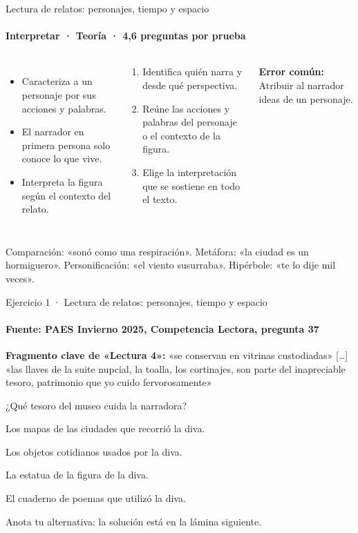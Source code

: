 \documentclass[aspectratio=169,11pt]{beamer}
\newcommand{\alternativa}[2]{\begin{opcion}\tecla{#1}\hspace{0.6em}#2\end{opcion}}
\newlength{\ajustealto}
\newenvironment{ajustar}[1][0.74\textheight]
  {\setlength{\ajustealto}{#1}\begin{lrbox}{\ajustecaja}\begin{minipage}{\textwidth}}
  {\end{minipage}\end{lrbox}%
   \ifdim\dimexpr\ht\ajustecaja+\dp\ajustecaja\relax>\ajustealto
     \resizebox*{!}{\ajustealto}{\usebox{\ajustecaja}}\else\usebox{\ajustecaja}\fi}
\begin{document}
\begin{frame}{Lectura de relatos: personajes, tiempo y espacio}
\label{tema-cl-literario}
\framesubtitle{Interpretar · Teoría · 4,6 preguntas por prueba}
\begin{ajustar}
\begin{columns}[T,onlytextwidth]
\begin{itemize}\footnotesize
\item Caracteriza a un personaje por sus acciones y palabras.
\item El narrador en primera persona solo conoce lo que vive.
\item Interpreta la figura según el contexto del relato.
\end{itemize}
\begin{cajaregla}\scriptsize \begin{enumerate}\item Identifica quién narra y desde qué perspectiva.\item Reúne las acciones y palabras del personaje o el contexto de la figura.\item Elige la interpretación que se sostiene en todo el texto.\end{enumerate}\end{cajaregla}
\begin{notagris}\scriptsize \textbf{Error común:} Atribuir al narrador ideas de un personaje.\end{notagris}
\end{columns}
\begin{cajaclave}\footnotesize
Comparación: «sonó como una respiración». Metáfora: «la ciudad es un hormiguero». Personificación: «el viento susurraba». Hipérbole: «te lo dije mil veces».
\end{cajaclave}
\end{ajustar}
\end{frame}

\begin{frame}{Ejercicio 1 · Lectura de relatos: personajes, tiempo y espacio}
\framesubtitle{Fuente: PAES Invierno 2025, Competencia Lectora, pregunta 37}
\begin{ajustar}[0.7\textheight]
\begin{notagris}\scriptsize \textbf{Fragmento clave de «Lectura 4»:} «se conservan en vitrinas custodiadas» [\ldots] «las llaves de la suite nupcial, la toalla, los cortinajes, son parte del inapreciable tesoro, patrimonio que yo cuido fervorosamente»\end{notagris}
{\small ¿Qué tesoro del museo cuida la narradora?}
\vspace{0.4em}
\alternativa{A}{Los mapas de las ciudades que recorrió la diva.}
\alternativa{B}{Los objetos cotidianos usados por la diva.}
\alternativa{C}{La estatua de la figura de la diva.}
\alternativa{D}{El cuaderno de poemas que utilizó la diva.}
\end{ajustar}
\vfill{\tiny\color{zinc500}\hfill Anota tu alternativa: la solución está en la lámina siguiente.}
\end{frame}
\end{document}
